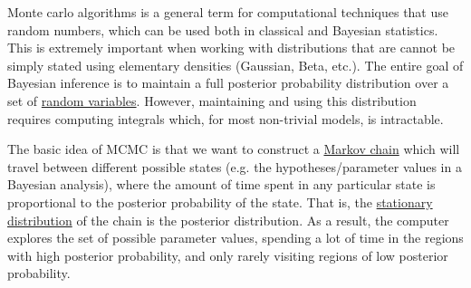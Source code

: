 Monte carlo algorithms is a general term for computational techniques that use random numbers, which can be used both in classical and Bayesian statistics. This is extremely important when working with distributions that are cannot be simply stated using elementary densities (Gaussian, Beta, etc.). The entire goal of Bayesian inference is to maintain a full posterior probability distribution over a set of \hyperref[prob-def:random-variable]{random variables}. However, maintaining and using this distribution requires computing integrals which, for most non-trivial models, is intractable.

The basic idea of MCMC is that we want to construct a \hyperref[sp-def:markov-chain]{Markov chain} which will travel between different possible states (e.g. the hypotheses/parameter values in a Bayesian analysis), where the amount of time spent in any particular state is proportional to the posterior probability of the state. That is, the \hyperref[sp-def:stationary-distribution]{stationary distribution} of the chain is the posterior distribution. As a result, the computer explores the set of possible parameter values, spending a lot of time in the regions with high posterior probability, and only rarely visiting regions of low posterior probability.

